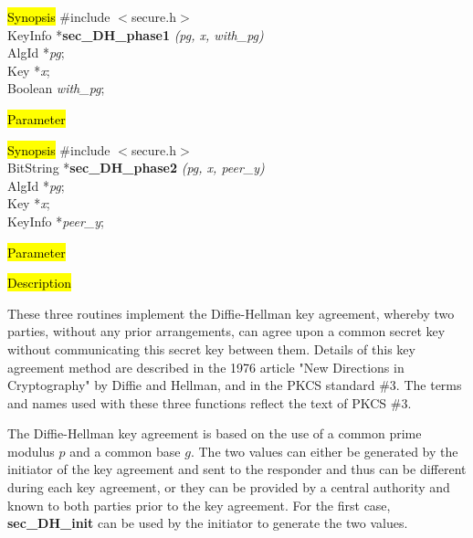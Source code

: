 \hl{Synopsis}
\#include $<$secure.h$>$ \\ [0.5cm]
KeyInfo *{\bf sec\_DH\_phase1} {\em (pg, x, with\_pg)} \\
AlgId *{\em pg}; \\
Key *{\em x}; \\
Boolean {\em with\_pg};

\hl{Parameter}





\hl{Synopsis}
\#include $<$secure.h$>$ \\ [0.5cm]
BitString *{\bf sec\_DH\_phase2} {\em (pg, x, peer\_y)} \\
AlgId *{\em pg}; \\
Key *{\em x}; \\
KeyInfo *{\em peer\_y};

\hl{Parameter}





\hl{Description}

These three routines implement the Diffie-Hellman key agreement, whereby two parties,
without any prior arrangements, can agree upon a common secret key without communicating
this secret key between them. Details of this key agreement method are described in
the 1976 article "New Directions in Cryptography" by Diffie and Hellman, and in the PKCS
standard \#3. The terms and names used with these three functions reflect the text of PKCS \#3.

The Diffie-Hellman key agreement is based on the use of a common prime modulus $p$ and a common
base $g$. The two values can either be generated by the initiator of the key agreement
and sent to the responder and thus can be different during each key agreement,
or they can be provided by a central authority and known to both parties prior to the
key agreement. For the first case, {\bf sec\_DH\_init} can be used by the initiator to generate
the two values. 

